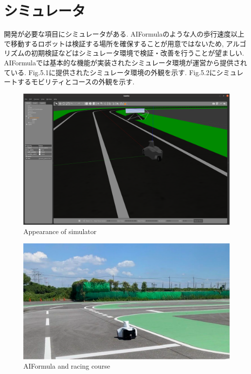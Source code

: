 
\section{シミュレータ}
開発が必要な項目にシミュレータがある.
AIFormulaのような人の歩行速度以上で移動するロボットは検証する場所を確保することが用意ではないため, アルゴリズムの初期検証などはシミュレータ環境で検証・改善を行うことが望ましい.
AIFormulaでは基本的な機能が実装されたシミュレータ環境が運営から提供されている.
Fig.5.1に提供されたシミュレータ環境の外観を示す.
Fig.5.2にシミュレートするモビリティとコースの外観を示す.

\begin{figure}[H]
  \centering
 \includegraphics[keepaspectratio, scale=0.2]
      {images/simulator.png}
 \caption{Appearance of simulator}
 \label{fig:simulator}
\end{figure}

\begin{figure}[H]
  \centering
 \includegraphics[keepaspectratio, scale=0.2]
      {images/realworld.png}
 \caption{AIFormula and racing course}
 \label{fig:simulator}
\end{figure}

